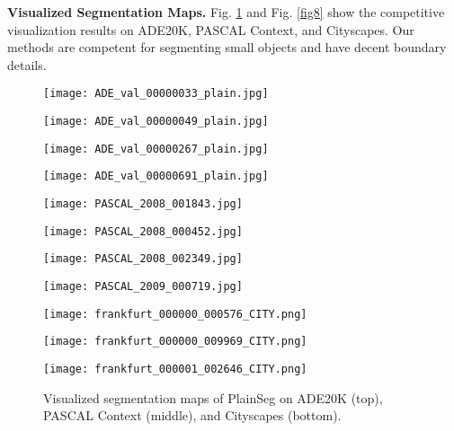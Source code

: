 \documentclass{article} \usepackage{iclr2024_conference,times}
\begin{document}
\textbf{Visualized Segmentation Maps.} Fig. \ref{fig7} and Fig. \ref{fig8} show the competitive visualization results on ADE20K, PASCAL Context, and Cityscapes. Our methods are competent for segmenting small objects and have decent boundary details.

\begin{figure}
\centering
\begin{minipage}{1.3in}
\texttt{[image: ADE\_val\_00000033\_plain.jpg]}
\end{minipage}
\begin{minipage}{1.3in}
\texttt{[image: ADE\_val\_00000049\_plain.jpg]}
\end{minipage}
\begin{minipage}{1.3in}
\texttt{[image: ADE\_val\_00000267\_plain.jpg]}
\end{minipage}
\vspace{0.3em}
\begin{minipage}{1.3in}
\texttt{[image: ADE\_val\_00000691\_plain.jpg]}
\end{minipage}
\begin{minipage}{1.3in}
\texttt{[image: PASCAL\_2008\_001843.jpg]}
\end{minipage}
\begin{minipage}{1.3in}
\texttt{[image: PASCAL\_2008\_000452.jpg]}
\end{minipage}
\begin{minipage}{1.3in}
\texttt{[image: PASCAL\_2008\_002349.jpg]}
\end{minipage}
\vspace{0.3em}
\begin{minipage}{1.3in}
\texttt{[image: PASCAL\_2009\_000719.jpg]}
\end{minipage}
\begin{minipage}{1.75in}
\texttt{[image: frankfurt\_000000\_000576\_CITY.png]}
\end{minipage}
\begin{minipage}{1.75in}
\texttt{[image: frankfurt\_000000\_009969\_CITY.png]}
\end{minipage}
\begin{minipage}{1.75in}
\texttt{[image: frankfurt\_000001\_002646\_CITY.png]}
\end{minipage}
\caption{Visualized segmentation maps of PlainSeg on ADE20K (top), PASCAL Context (middle), and Cityscapes (bottom).}
\label{fig7}
\end{figure}
\end{document}
